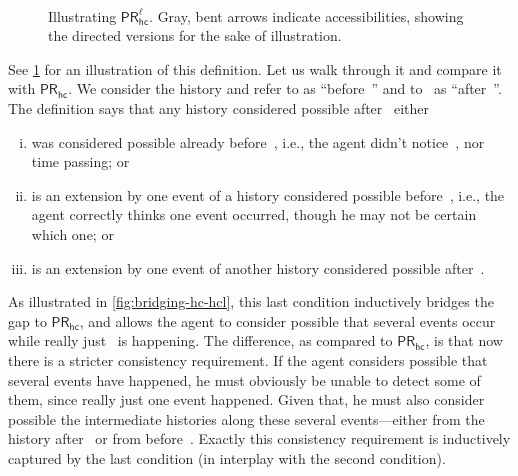 \documentclass{article}
\newcommand{\PRhc}{\ensuremath{\mathsf{PR_{hc}}}\xspace}
\newcommand{\PRhcl}{\ensuremath{\mathsf{PR_{hc}^\ell}}\xspace}
\newcounter{#1}
\begin{document}
\begin{figure}
  \hfill~
  \caption{Illustrating \PRhcl. Gray, bent arrows indicate accessibilities, showing the directed versions for the sake of illustration.}
  \label{fig:prhcl}
\end{figure}

See \cref{fig:prhcl} for an illustration of this definition.
Let us walk through it and compare it with \PRhc.
We consider the history  and refer to  as ``before~'' and to~ as ``after~''.
The definition says that any history considered possible after~
either
\begin{enumerate}[(i)]
\item was considered possible already before~,
  i.e., the agent didn't notice~, nor time passing; or
\item is an extension by one event of a history considered possible before~,
  i.e., the agent correctly thinks one event occurred, though he may not be certain which one; or
\item is an extension by one event of another history considered possible after~.
\end{enumerate}
As illustrated in \cref{fig:bridging-hc-hcl}, this last condition inductively bridges the gap to \PRhc,
and allows the agent to consider possible that several events occur while really just~ is happening.
The difference, as compared to \PRhc, is that now there is a stricter consistency requirement.
If the agent considers possible that several events have happened,
he must obviously be unable to detect some of them, since really just one event happened.
Given that, he must also consider possible the intermediate histories along these several events---either from the history after~ or from before~.
Exactly this consistency requirement is inductively captured by the last condition
(in interplay with the second condition).
\end{document}
